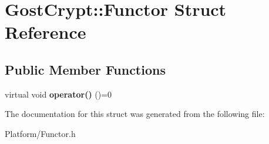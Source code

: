 \hypertarget{struct_gost_crypt_1_1_functor}{}\section{Gost\+Crypt\+:\+:Functor Struct Reference}
\label{struct_gost_crypt_1_1_functor}
\subsection*{Public Member Functions}
\begin{DoxyCompactItemize}
\item 
\mbox{\label{struct_gost_crypt_1_1_functor_a069fc931b0ec3962130cde6aad980c01}} 
virtual void {\bfseries operator()} ()=0
\end{DoxyCompactItemize}


The documentation for this struct was generated from the following file\+:\begin{DoxyCompactItemize}
\item 
Platform/Functor.\+h\end{DoxyCompactItemize}
